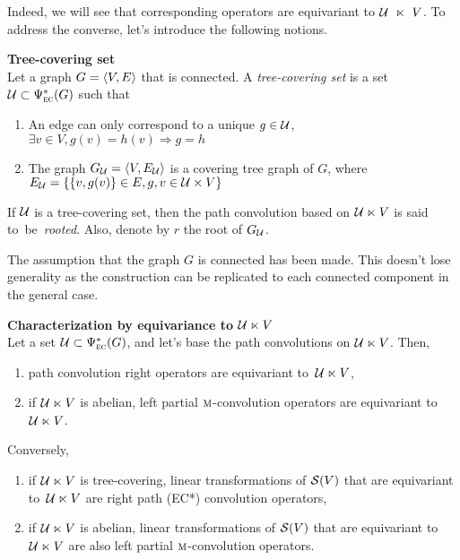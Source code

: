 Indeed, we will see that corresponding operators are equivariant to $\mathcal{U}~\ltimes~V$. To address the converse, let's introduce the following notions.

\begin{definition}\textbf{Tree-covering set}\\
Let a graph $G = \langle V, E \rangle$ that is connected. A \emph{tree-covering set} is a set $\mathcal{U} \subset \Psi_{\operatorname{\textsc{ec}}}^*(G)$ such that
\begin{enumerate}
  \item An edge can only correspond to a unique $g\in \mathcal{U}$,\\
    \ie $\exists v \in V, g(v) = h(v) \Rightarrow g=h$
  \item The graph $G_{\mathcal{U}} = \langle V, E_{\mathcal{U}} \rangle$ is a covering tree graph of $G$, where\\
    $E_{\mathcal{U}} = \{\{v, g(v)\} \in E, g, v \in \mathcal{U} \times V\}$
\end{enumerate}
If $\mathcal{U}$ is a tree-covering set, then the path convolution based on  $\mathcal{U} \ltimes V$ is said to~be~\emph{rooted}.
Also, denote by $r$ the root of $G_{\mathcal{U}}$.
\end{definition}

\begin{remark}The assumption that the graph $G$ is connected has been made. This doesn't lose generality as the construction can be replicated to each connected component in the general case.
\end{remark}

\begin{proposition}\textbf{Characterization by equivariance to $\mathcal{U} \ltimes V$}\\
Let a set $\mathcal{U} \subset \Psi_{\operatorname{\textsc{ec}}}^*(G)$, and let's base the path convolutions on $\mathcal{U} \ltimes V$. Then,
\begin{enumerate}[label=(\roman*)]
  \item path convolution right operators are equivariant to~$\mathcal{U} \ltimes V$,\label{enum:i}
  \item if $\mathcal{U} \ltimes V$ is abelian, left partial $\operatorname{\textsc{m}}$-convolution operators are equivariant to~$\mathcal{U} \ltimes V$.\label{enum:ii}
\end{enumerate}
Conversely,
\begin{enumerate}[label=(\roman*)]
  \item if $\mathcal{U} \ltimes V$ is tree-covering, linear transformations of $\mathcal{S}(V)$ that are equivariant to~$\mathcal{U} \ltimes V$ are right path (EC*) convolution operators,
  \item if $\mathcal{U} \ltimes V$ is abelian, linear transformations of $\mathcal{S}(V)$ that are equivariant to~$\mathcal{U} \ltimes V$ are also left partial $\operatorname{\textsc{m}}$-convolution operators.
\end{enumerate}
\end{proposition}


